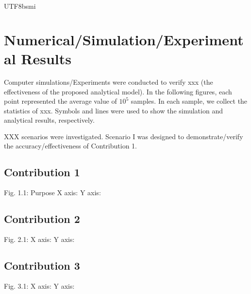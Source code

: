 \documentclass[conference]{IEEEtran}
\begin{document}
\begin{CJK}{UTF8}{bsmi}
\section{Numerical/Simulation/Experimental Results}
Computer simulations/Experiments were conducted to verify xxx (the effectiveness of the proposed analytical model). 
In the following figures, each point represented the average value of $10^5$ samples. In each sample, we collect the statistics of xxx. Symbols and lines were used to show the simulation and analytical results, respectively. 

XXX scenarios were investigated. Scenario I was designed to demonstrate/verify the accuracy/effectiveness of Contribution 1.

\subsection{Contribution 1}
Fig. 1.1: Purpose
    X axis: 
    Y axis:
\subsection{Contribution 2}
Fig. 2.1: 
    X axis: 
    Y axis:
\subsection{Contribution 3}
Fig. 3.1: 
    X axis: 
    Y axis:


\end{CJK}\
\end{document}
